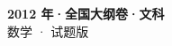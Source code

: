 \documentclass[zihao=-4, a4paper]{ctexart}
\begin{document}
\begin{center}
  {\Large\bfseries 2012 年·全国大纲卷·文科}\\[4pt]
  {\large 数学 · 试题版}
\end{center}
\medskip
{}

\end{document}
